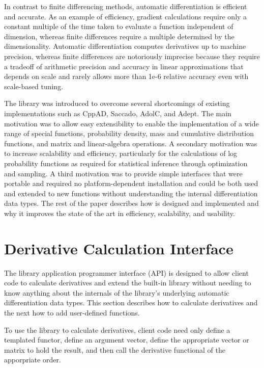 \documentclass[10pt]{article}
\begin{document}
In contrast to finite differencing methods, automatic differentiation
is efficient and accurate. As an example of efficiency, gradient
calculations require only a constant multiple of the time taken to
evaluate a function independent of dimension, whereas finite
differences require a multiple determined by the dimensionality.
Automatic differentiation computes derivatives up to machine
precision, whereas finite differences are notoriously imprecise
because they require a tradeoff of arithmetic precision and accuracy
in linear approximations that depends on scale and rarely allows more
than 1e-6 relative accuracy even with scale-based tuning.

The  library was introduced to overcome several
shortcomings of existing implementations such as CppAD, Saccado,
AdolC, and Adept. The main motivation was to allow easy extensibility
to enable the implementation of a wide range of special functions,
probability density, mass and cumulative distribution functions, and
matrix and linear-algebra operations. A secondary motivation was to
increase scalability and efficiency, particularly for the calculations
of log probability functions as required for statistical inference
through optimization and sampling. A third motivation was to provide
simple interfaces that were portable and required no
platform-dependent installation and could be both used and extended to
new functions without understanding the internal differentiation data
types. The rest of the paper describes how  is designed
and implemented and why it improves the state of the art in
efficiency, scalability, and usability.




\section{Derivative Calculation Interface}

The  library application programmer interface (API) is
designed to allow client code to calculate derivatives and extend the
built-in library without needing to know anything about the internals
of the library's underlying automatic differentiation data types.
This section describes how to calculate derivatives and the next how
to add user-defined functions.

To use the  library to calculate derivatives, client code
need only define a templated functor, define an argument vector,
define the appropriate vector or matrix to hold the result, and then
call the derivative functional of the apporpriate order.
\end{document}
